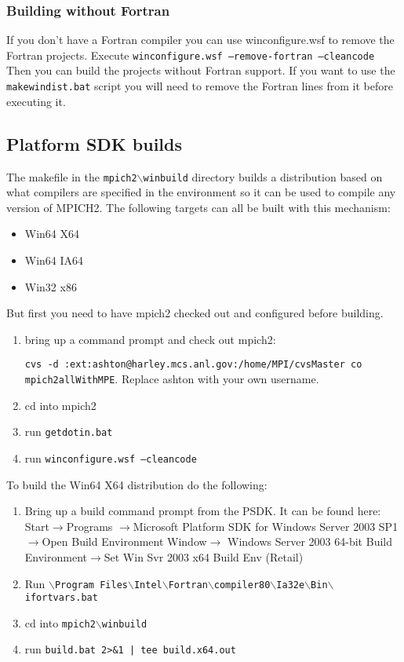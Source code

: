 \documentclass[dvipdfm,11pt]{article}
\begin{document}
\subsubsection{Building without Fortran}
If you don't have a Fortran compiler you can use winconfigure.wsf to remove the
Fortran projects.  Execute \texttt{winconfigure.wsf --remove-fortran --cleancode}
Then you can build the projects without Fortran support.  If you want to use the
\texttt{makewindist.bat} script you will need to remove the Fortran lines from
it before executing it.

\subsection{Platform SDK builds}
\label{sec:psdk_build}

The makefile in the \texttt{mpich2$\backslash$winbuild} directory builds a distribution based 
on what compilers are specified in the environment so it can be used to compile any version of
MPICH2.  The following targets can all be built with this mechanism:
\begin{itemize}
\item Win64 X64
\item Win64 IA64
\item Win32 x86
\end{itemize}

But first you need to have mpich2 checked out and configured before building.
\begin{enumerate}
\item bring up a command prompt and check out mpich2: 

\texttt{cvs -d :ext:ashton@harley.mcs.anl.gov:/home/MPI/cvsMaster co mpich2allWithMPE}.  Replace ashton with your own username.
\item cd into mpich2
\item run \texttt{getdotin.bat}
\item run \texttt{winconfigure.wsf --cleancode}
\end{enumerate}

To build the Win64 X64 distribution do the following:
\begin{enumerate}
\item Bring up a build command prompt from the PSDK.  It can be found here: Start$\to$Programs
$\to$Microsoft Platform SDK for Windows Server 2003 SP1$\to$Open Build Environment Window$\to$
Windows Server 2003 64-bit Build Environment$\to$Set Win Svr 2003 x64 Build Env (Retail)
\item Run \texttt{$\backslash$Program Files$\backslash$Intel$\backslash$Fortran$\backslash$compiler80$\backslash$Ia32e$\backslash$Bin$\backslash$ifortvars.bat}
\item cd into \texttt{mpich2$\backslash$winbuild}
\item run \texttt{build.bat 2>\&1 | tee build.x64.out}
\end{enumerate}
\end{document}
